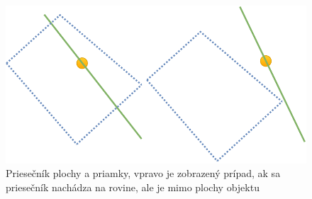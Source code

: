 \begin{figure}[H]
	\centering
	\includegraphics[height=0.3\textwidth]{obrazky-figures/Diagram/Draw/1Points/DP Navrh operacii-0D - PointIntersectionPlaneLine.pdf}
	\caption{Priesečník plochy a priamky, vpravo je zobrazený prípad, ak sa priesečník nachádza na rovine, ale je mimo plochy objektu}
	\label{fig:GraphIntersection_Plane_Line}
\end{figure}








